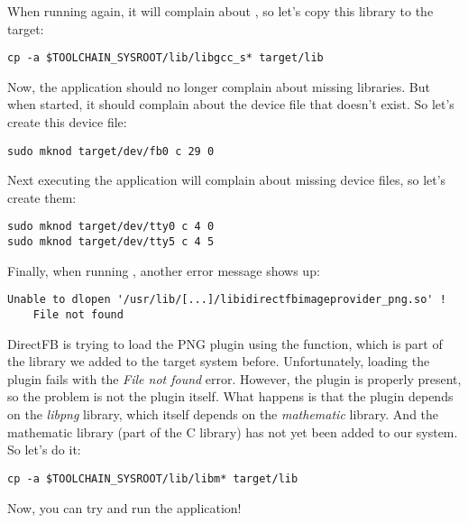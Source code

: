When running  again, it will complain about
, so let's copy this library to the target:

\begin{verbatim}
cp -a $TOOLCHAIN_SYSROOT/lib/libgcc_s* target/lib
\end{verbatim}

Now, the application should no longer complain about missing
libraries. But when started, it should complain about the 
device file that doesn't exist. So let's create this device file:

\begin{verbatim}
sudo mknod target/dev/fb0 c 29 0
\end{verbatim}

Next executing the application will complain about missing
 device files, so let's create them:

\begin{verbatim}
sudo mknod target/dev/tty0 c 4 0
sudo mknod target/dev/tty5 c 4 5
\end{verbatim}

Finally, when running , another error message shows up:

\small
\begin{verbatim}
Unable to dlopen '/usr/lib/[...]/libidirectfbimageprovider_png.so' !
	File not found
\end{verbatim}
\normalsize

DirectFB is trying to load the PNG plugin using the  function,
which is part of the  library we added to the target system
before. Unfortunately, loading the plugin fails with the {\em File not
found} error. However, the plugin is properly present, so the problem
is not the plugin itself. What happens is that the plugin depends on
the {\em libpng} library, which itself depends on the {\em mathematic}
library. And the mathematic library  (part of the C library) has
not yet been added to our system. So let's do it:

\begin{verbatim}
cp -a $TOOLCHAIN_SYSROOT/lib/libm* target/lib
\end{verbatim}

Now, you can try and run the  application!
